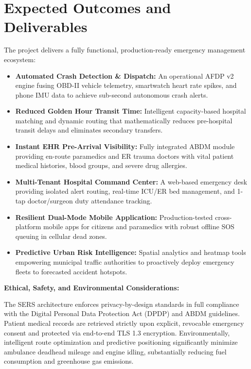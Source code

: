 \documentclass[12pt,a4paper]{article}
\begin{document}
\clearpage
\section{Expected Outcomes and Deliverables}
The project delivers a fully functional, production-ready emergency management ecosystem:
\begin{itemize}
    \item \textbf{Automated Crash Detection & Dispatch:} An operational AFDP v2 engine fusing OBD-II vehicle telemetry, smartwatch heart rate spikes, and phone IMU data to achieve sub-second autonomous crash alerts.
    \item \textbf{Reduced Golden Hour Transit Time:} Intelligent capacity-based hospital matching and dynamic routing that mathematically reduces pre-hospital transit delays and eliminates secondary transfers.
    \item \textbf{Instant EHR Pre-Arrival Visibility:} Fully integrated ABDM module providing en-route paramedics and ER trauma doctors with vital patient medical histories, blood groups, and severe drug allergies.
    \item \textbf{Multi-Tenant Hospital Command Center:} A web-based emergency desk providing isolated alert routing, real-time ICU/ER bed management, and 1-tap doctor/surgeon duty attendance tracking.
    \item \textbf{Resilient Dual-Mode Mobile Application:} Production-tested cross-platform mobile apps for citizens and paramedics with robust offline SOS queuing in cellular dead zones.
    \item \textbf{Predictive Urban Risk Intelligence:} Spatial analytics and heatmap tools empowering municipal traffic authorities to proactively deploy emergency fleets to forecasted accident hotspots.
\end{itemize}

\vspace{0.6cm}
\textbf{Ethical, Safety, and Environmental Considerations:} 

The SERS architecture enforces privacy-by-design standards in full compliance with the Digital Personal Data Protection Act (DPDP) and ABDM guidelines. Patient medical records are retrieved strictly upon explicit, revocable emergency consent and protected via end-to-end TLS 1.3 encryption. Environmentally, intelligent route optimization and predictive positioning significantly minimize ambulance deadhead mileage and engine idling, substantially reducing fuel consumption and greenhouse gas emissions.
\end{document}
